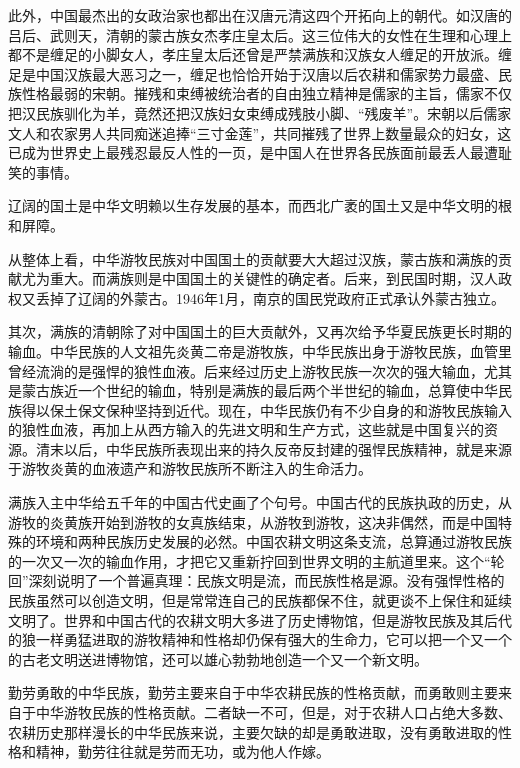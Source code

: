 \par 此外，中国最杰出的女政治家也都出在汉唐元清这四个开拓向上的朝代。如汉唐的吕后、武则天，清朝的蒙古族女杰孝庄皇太后。这三位伟大的女性在生理和心理上都不是缠足的小脚女人，孝庄皇太后还曾是严禁满族和汉族女人缠足的开放派。缠足是中国汉族最大恶习之一，缠足也恰恰开始于汉唐以后农耕和儒家势力最盛、民族性格最弱的宋朝。摧残和束缚被统治者的自由独立精神是儒家的主旨，儒家不仅把汉民族驯化为羊，竟然还把汉族妇女束缚成残肢小脚、“残废羊”。宋朝以后儒家文人和农家男人共同痴迷追捧“三寸金莲”，共同摧残了世界上数量最众的妇女，这已成为世界史上最残忍最反人性的一页，是中国人在世界各民族面前最丢人最遭耻笑的事情。
\par 辽阔的国土是中华文明赖以生存发展的基本，而西北广袤的国土又是中华文明的根和屏障。
\par 从整体上看，中华游牧民族对中国国土的贡献要大大超过汉族，蒙古族和满族的贡献尤为重大。而满族则是中国国土的关键性的确定者。后来，到民国时期，汉人政权又丢掉了辽阔的外蒙古。1946年1月，南京的国民党政府正式承认外蒙古独立。
\par 其次，满族的清朝除了对中国国土的巨大贡献外，又再次给予华夏民族更长时期的输血。中华民族的人文祖先炎黄二帝是游牧族，中华民族出身于游牧民族，血管里曾经流淌的是强悍的狼性血液。后来经过历史上游牧民族一次次的强大输血，尤其是蒙古族近一个世纪的输血，特别是满族的最后两个半世纪的输血，总算使中华民族得以保土保文保种坚持到近代。现在，中华民族仍有不少自身的和游牧民族输入的狼性血液，再加上从西方输入的先进文明和生产方式，这些就是中国复兴的资源。清末以后，中华民族所表现出来的持久反帝反封建的强悍民族精神，就是来源于游牧炎黄的血液遗产和游牧民族所不断注入的生命活力。
\par 满族入主中华给五千年的中国古代史画了个句号。中国古代的民族执政的历史，从游牧的炎黄族开始到游牧的女真族结束，从游牧到游牧，这决非偶然，而是中国特殊的环境和两种民族历史发展的必然。中国农耕文明这条支流，总算通过游牧民族的一次又一次的输血作用，才把它又重新拧回到世界文明的主航道里来。这个“轮回”深刻说明了一个普遍真理：民族文明是流，而民族性格是源。没有强悍性格的民族虽然可以创造文明，但是常常连自己的民族都保不住，就更谈不上保住和延续文明了。世界和中国古代的农耕文明大多进了历史博物馆，但是游牧民族及其后代的狼一样勇猛进取的游牧精神和性格却仍保有强大的生命力，它可以把一个又一个的古老文明送进博物馆，还可以雄心勃勃地创造一个又一个新文明。
\par 勤劳勇敢的中华民族，勤劳主要来自于中华农耕民族的性格贡献，而勇敢则主要来自于中华游牧民族的性格贡献。二者缺一不可，但是，对于农耕人口占绝大多数、农耕历史那样漫长的中华民族来说，主要欠缺的却是勇敢进取，没有勇敢进取的性格和精神，勤劳往往就是劳而无功，或为他人作嫁。
